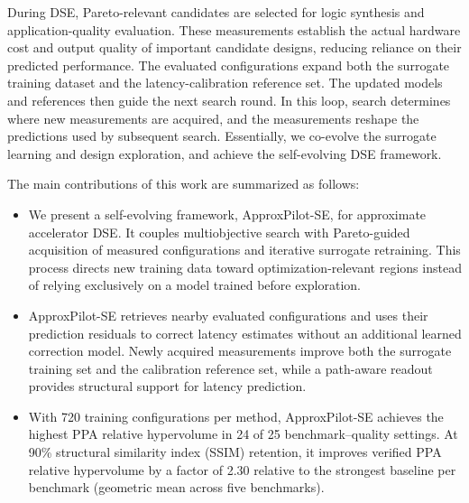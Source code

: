 During DSE, Pareto-relevant candidates are selected for logic synthesis and application-quality evaluation.
These measurements establish the actual hardware cost and output quality of important candidate designs, reducing reliance on their predicted performance.
The evaluated configurations expand both the surrogate training dataset and the latency-calibration reference set.
The updated models and references then guide the next search round.
In this loop, search determines where new measurements are acquired, and the measurements reshape the predictions used by subsequent search.
Essentially, we co-evolve the surrogate learning and design exploration, and achieve the self-evolving DSE framework.

The main contributions of this work are summarized as follows:
\begin{itemize}
    \item We present a self-evolving framework, ApproxPilot-SE, for approximate accelerator DSE. It couples multiobjective search with Pareto-guided acquisition of measured configurations and iterative surrogate retraining. This process directs new training data toward optimization-relevant regions instead of relying exclusively on a model trained before exploration.

    \item ApproxPilot-SE retrieves nearby evaluated configurations and uses their prediction residuals to correct latency estimates without an additional learned correction model.
    Newly acquired measurements improve both the surrogate training set and the calibration reference set, while a path-aware readout provides structural support for latency prediction.

    \item With 720 training configurations per method, ApproxPilot-SE achieves the highest PPA relative hypervolume in 24 of 25 benchmark--quality settings.
    At 90\% structural similarity index (SSIM) retention, it improves verified PPA relative hypervolume by a factor of 2.30 relative to the strongest baseline per benchmark (geometric mean across five benchmarks).
\end{itemize}
